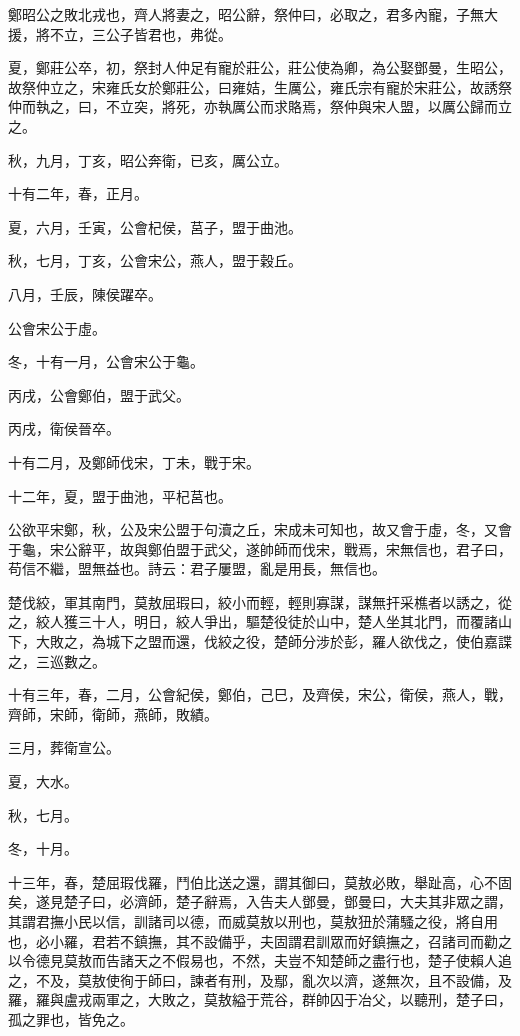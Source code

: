 \begin{pinyinscope}
鄭昭公之敗北戎也，齊人將妻之，昭公辭，祭仲曰，必取之，君多內寵，子無大援，將不立，三公子皆君也，弗從。

夏，鄭莊公卒，初，祭封人仲足有寵於莊公，莊公使為卿，為公娶鄧曼，生昭公，故祭仲立之，宋雍氏女於鄭莊公，曰雍姞，生厲公，雍氏宗有寵於宋莊公，故誘祭仲而執之，曰，不立突，將死，亦執厲公而求賂焉，祭仲與宋人盟，以厲公歸而立之。

秋，九月，丁亥，昭公奔衛，已亥，厲公立。

十有二年，春，正月。

夏，六月，壬寅，公會杞侯，莒子，盟于曲池。

秋，七月，丁亥，公會宋公，燕人，盟于穀丘。

八月，壬辰，陳侯躍卒。

公會宋公于虛。

冬，十有一月，公會宋公于龜。

丙戌，公會鄭伯，盟于武父。

丙戌，衛侯晉卒。

十有二月，及鄭師伐宋，丁未，戰于宋。

十二年，夏，盟于曲池，平杞莒也。

公欲平宋鄭，秋，公及宋公盟于句瀆之丘，宋成未可知也，故又會于虛，冬，又會于龜，宋公辭平，故與鄭伯盟于武父，遂帥師而伐宋，戰焉，宋無信也，君子曰，苟信不繼，盟無益也。詩云：君子屢盟，亂是用長，無信也。

楚伐絞，軍其南門，莫敖屈瑕曰，絞小而輕，輕則寡謀，謀無扞采樵者以誘之，從之，絞人獲三十人，明日，絞人爭出，驅楚役徒於山中，楚人坐其北門，而覆諸山下，大敗之，為城下之盟而還，伐絞之役，楚師分涉於彭，羅人欲伐之，使伯嘉諜之，三巡數之。

十有三年，春，二月，公會紀侯，鄭伯，己巳，及齊侯，宋公，衛侯，燕人，戰，齊師，宋師，衛師，燕師，敗績。

三月，葬衛宣公。

夏，大水。

秋，七月。

冬，十月。

十三年，春，楚屈瑕伐羅，鬥伯比送之還，謂其御曰，莫敖必敗，舉趾高，心不固矣，遂見楚子曰，必濟師，楚子辭焉，入告夫人鄧曼，鄧曼曰，大夫其非眾之謂，其謂君撫小民以信，訓諸司以德，而威莫敖以刑也，莫敖狃於蒲騷之役，將自用也，必小羅，君若不鎮撫，其不設備乎，夫固謂君訓眾而好鎮撫之，召諸司而勸之以令德見莫敖而告諸天之不假易也，不然，夫豈不知楚師之盡行也，楚子使賴人追之，不及，莫敖使徇于師曰，諫者有刑，及鄢，亂次以濟，遂無次，且不設備，及羅，羅與盧戎兩軍之，大敗之，莫敖縊于荒谷，群帥囚于冶父，以聽刑，楚子曰，孤之罪也，皆免之。


\end{pinyinscope}
